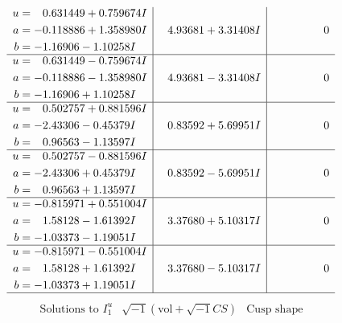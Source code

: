\documentclass[1p]{elsarticle_modified}
\theoremstyle{definition}
\newcommand{\I}{\sqrt{-1}}
\begin{document}
$$\begin{array}{c|c|c}
\begin{aligned}
u &= \phantom{-}0.631449 + 0.759674 I \\
a &= -0.118886 + 1.358980 I \\
b &= -1.16906 - 1.10258 I\end{aligned}
 & \phantom{-}4.93681 + 3.31408 I & \phantom{-0.000000 } 0 \\ \hline\begin{aligned}
u &= \phantom{-}0.631449 - 0.759674 I \\
a &= -0.118886 - 1.358980 I \\
b &= -1.16906 + 1.10258 I\end{aligned}
 & \phantom{-}4.93681 - 3.31408 I & \phantom{-0.000000 } 0 \\ \hline\begin{aligned}
u &= \phantom{-}0.502757 + 0.881596 I \\
a &= -2.43306 - 0.45379 I \\
b &= \phantom{-}0.96563 - 1.13597 I\end{aligned}
 & \phantom{-}0.83592 + 5.69951 I & \phantom{-0.000000 } 0 \\ \hline\begin{aligned}
u &= \phantom{-}0.502757 - 0.881596 I \\
a &= -2.43306 + 0.45379 I \\
b &= \phantom{-}0.96563 + 1.13597 I\end{aligned}
 & \phantom{-}0.83592 - 5.69951 I & \phantom{-0.000000 } 0 \\ \hline\begin{aligned}
u &= -0.815971 + 0.551004 I \\
a &= \phantom{-}1.58128 - 1.61392 I \\
b &= -1.03373 - 1.19051 I\end{aligned}
 & \phantom{-}3.37680 + 5.10317 I & \phantom{-0.000000 } 0 \\ \hline\begin{aligned}
u &= -0.815971 - 0.551004 I \\
a &= \phantom{-}1.58128 + 1.61392 I \\
b &= -1.03373 + 1.19051 I\end{aligned}
 & \phantom{-}3.37680 - 5.10317 I & \phantom{-0.000000 } 0\\
 \hline 
 \end{array}$$\newpage$$\begin{array}{c|c|c}  
\text{Solutions to }I^u_{1}& \I (\text{vol} + \sqrt{-1}CS) & \text{Cusp shape}\\
 \hline 
\begin{aligned}

\end{aligned}
\end{array}$$
\end{document}
